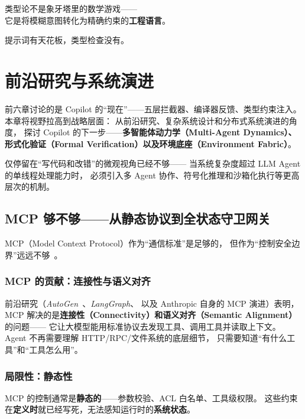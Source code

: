 \documentclass[10pt, openany]{book}
\begin{document}
\begin{framed}
\centering
\large 类型论不是象牙塔里的数学游戏——\\
它是将模糊意图转化为精确约束的\textbf{工程语言}。

提示词有天花板，类型检查没有。\cite{Liu2023LostInMiddle}
\end{framed}


\chapter{前沿研究与系统演进}

前六章讨论的是 Copilot 的``现在''——五层拦截器、编译器反馈、类型约束注入。
本章将视野拉高到战略层面：
从前沿研究、复杂系统设计和分布式系统演进的角度，
探讨 Copilot 的下一步——\textbf{多智能体动力学（Multi-Agent Dynamics）、
形式化验证（Formal Verification）以及环境底座（Environment Fabric）}。

仅停留在``写代码和改错''的微观视角已经不够——
当系统复杂度超过 LLM Agent 的单线程处理能力时，
必须引入多 Agent 协作、符号化推理和沙箱化执行等更高层次的机制。

\section{MCP 够不够——从静态协议到全状态守卫网关}

MCP（Model Context Protocol）作为``通信标准''是足够的，
但作为``控制安全边界''远远不够~\cite{Anthropic2024MCP}。

\subsection{MCP 的贡献：连接性与语义对齐}

前沿研究（\emph{AutoGen}~\cite{Wu2024AutoGen}、\emph{LangGraph}、
以及 Anthropic 自身的 MCP 演进）表明，
MCP 解决的是\textbf{连接性（Connectivity）和语义对齐（Semantic Alignment）}的问题——
它让大模型能用标准协议去发现工具、调用工具并读取上下文。
Agent 不再需要理解 HTTP/RPC/文件系统的底层细节，
只需要知道``有什么工具''和``工具怎么用''。

\subsection{局限性：静态性}

MCP 的控制通常是\textbf{静态的}——参数校验、ACL 白名单、工具级权限。
这些约束在\textbf{定义时}就已经写死，无法感知运行时的\textbf{系统状态}。
\end{document}
